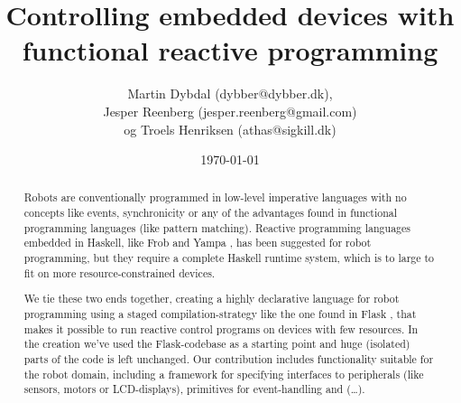 \documentclass[a4paper, oneside, final]{memoir}
\title{Controlling embedded devices with functional reactive programming}
\author{Martin Dybdal (dybber@dybber.dk), \\
Jesper Reenberg (jesper.reenberg@gmail.com) \\ og
Troels Henriksen (athas@sigkill.dk)}
\date{\today}
\begin{document}
\maketitle

\begin{abstract}
  Robots are conventionally programmed in low-level imperative
  languages with no concepts like events, synchronicity or any of the
  advantages found in functional programming languages (like pattern
  matching). Reactive programming languages embedded in Haskell, like
  Frob \cite{frob99} and Yampa \cite{arrowsrobotsfrp02}, has been
  suggested for robot programming, but they require a complete Haskell
  runtime system, which is to large to fit on more
  resource-constrained devices. 

  We tie these two ends together, creating a highly declarative
  language for robot programming using a staged compilation-strategy
  like the one found in Flask \cite{flask08}, that makes it possible
  to run reactive control programs on devices with few resources. In
  the creation we've used the Flask-codebase as a starting point and
  huge (isolated) parts of the code is left unchanged. Our
  contribution includes functionality suitable for the robot domain,
  including a framework for specifying interfaces to peripherals (like
  sensors, motors or LCD-displays), primitives for event-handling and
  (\ldots).
\end{abstract}

\clearpage 

\tableofcontents*

\end{document}
